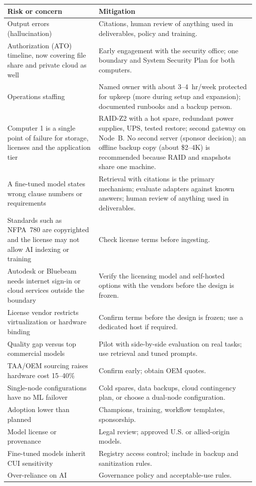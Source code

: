 
{\footnotesize
\begin{xltabular}{\textwidth}{@{}Y{0.769}Y{1.231}@{}}
  \toprule
  Risk or concern & Mitigation \\
  \midrule
  \endhead
  Output errors (hallucination) & Citations, human review of anything used in deliverables, policy and training. \\
  Authorization (ATO) timeline, now covering file share and private cloud as well & Early engagement with the security office; one boundary and System Security Plan for both computers. \\
  Operations staffing & Named owner with about 3--4~hr/week protected for upkeep (more during setup and expansion); documented runbooks and a backup person. \\
  Computer 1 is a single point of failure for storage, licenses and the application tier & RAID-Z2 with a hot spare, redundant power supplies, UPS, tested restore; second gateway on Node~B. No second server (sponsor decision); an offline backup copy (about \$2--4K) is recommended because RAID and snapshots share one machine. \\
  A fine-tuned model states wrong clause numbers or requirements & Retrieval with citations is the primary mechanism; evaluate adapters against known answers; human review of anything used in deliverables. \\
  Standards such as NFPA~780 are copyrighted and the license may not allow AI indexing or training & Check license terms before ingesting. \\
  Autodesk or Bluebeam needs internet sign-in or cloud services outside the boundary & Verify the licensing model and self-hosted options with the vendors before the design is frozen. \\
  License vendor restricts virtualization or hardware binding & Confirm terms before the design is frozen; use a dedicated host if required. \\
  Quality gap versus top commercial models & Pilot with side-by-side evaluation on real tasks; use retrieval and tuned prompts. \\
  TAA/OEM sourcing raises hardware cost 15--40\% & Confirm early; obtain OEM quotes. \\
  Single-node configurations have no ML failover & Cold spares, data backups, cloud contingency plan, or choose a dual-node configuration. \\
  Adoption lower than planned & Champions, training, workflow templates, sponsorship. \\
  Model license or provenance & Legal review; approved U.S. or allied-origin models. \\
  Fine-tuned models inherit CUI sensitivity & Registry access control; include in backup and sanitization rules. \\
  Over-reliance on AI & Governance policy and acceptable-use rules. \\
  \bottomrule
\end{xltabular}}

